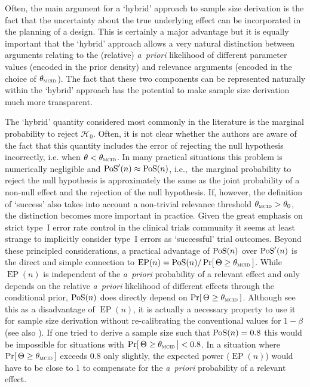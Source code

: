 \documentclass{article}
\renewcommand{\Pr}{\operatorname{Pr}}
\newcommand{\EP}{\operatorname{EP}}
\begin{document}
Often, the main argument for a `hybrid' approach to sample size derivation is the fact that the uncertainty about the true underlying effect can be incorporated in the planning of a design.
This is certainly a major advantage but it is equally important that
the `hybrid' approach allows a very natural distinction between
arguments relating to the (relative) \textit{a~priori} likelihood of different parameter values (encoded in the prior density)
and relevance arguments (encoded in the choice of $\mcid$).
The fact that these two components can be represented naturally within the `hybrid' approach has the potential to make sample size derivation much more transparent.

The `hybrid' quantity considered most commonly in the literature is the marginal probability to reject $\mathcal{H}_0$.
Often, it is not clear whether the authors are aware of the fact that this quantity includes the error of rejecting the null hypothesis incorrectly, i.e. when $\theta<\mcid$. %
In many practical situations this problem is numerically negligible and $\operatorname{PoS}'(n)\approx\operatorname{PoS}(n)$, i.e.,~the marginal probability to reject the null hypothesis is approximately the same
as the joint probability of a non-null effect and the rejection of the null hypothesis.
If, however, the definition of `success' also takes into account a non-trivial relevance threshold $\mcid>\theta_0$,
the distinction becomes more important in practice.
Given the great emphasis on strict type~I error rate control in the clinical trials community it seems at least strange to implicitly consider type~I errors as `successful' trial outcomes.
Beyond these principled considerations,
a practical advantage of $\operatorname{PoS}(n)$ over $\operatorname{PoS}'(n)$ is the
direct and simple connection to $\EP(n) = \PoS(n) / \Pr[\,\Theta\geq\mcid\,]$.
While $\EP(n)$ is independent of the \textit{a~priori} probability
of a relevant effect and only depends on the relative \textit{a~priori} likelihood of different effects through the
conditional prior, $\operatorname{PoS}(n)$ does directly depend on $\Pr[\,\Theta\geq\mcid\,]$.
Although \citet{spiegelhalter-2004} see this as a disadvantage of $\EP(n)$, it is actually a necessary property to use it for sample size derivation without re-calibrating the conventional values for $1-\beta$ (see also \citealp{brown1987projection}).
If one tried to derive a sample size such that $\operatorname{PoS}(n)=0.8$ this would be impossible for situations with $\Pr[\,\Theta\geq\mcid\,]<0.8$.
In a situation where $\Pr[\,\Theta\geq\mcid\,]$ exceeds 0.8 only slightly, the expected power ($\EP(n)$) would have to be close to 1 to compensate for the \textit{a~priori} probability of a relevant effect.
\end{document}
